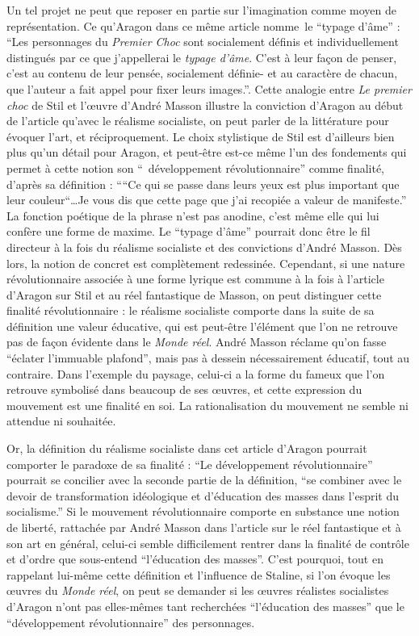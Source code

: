 	Un tel projet ne peut que reposer en partie sur l’imagination comme moyen de représentation. Ce qu’Aragon dans ce même article nomme le \enquote{typage d’âme} : \enquote{Les personnages du \emph{Premier Choc} sont socialement définis et individuellement distingués par ce que j’appellerai le \emph{typage d’âme}. C’est à leur façon de penser, c’est au contenu de leur pensée, socialement définie- et au caractère de chacun, que l’auteur a fait appel pour fixer leurs images.}. Cette analogie entre \emph{Le premier choc} de Stil et l’\oe{}uvre d’André Masson illustre la conviction d’Aragon au début de l’article qu’avec le réalisme socialiste, on peut parler de la littérature pour évoquer l’art, et réciproquement.  Le choix stylistique de Stil est d’ailleurs bien plus qu’un détail pour Aragon, et peut-être est-ce même l’un des fondements qui permet à cette notion son \enquote{ développement révolutionnaire} comme finalité, d’après sa définition : \enquote{“Ce qui se passe dans leurs yeux est plus important que leur couleur“…Je vous dis que cette page que j’ai recopiée a valeur de manifeste.} La fonction poétique de la phrase n’est pas anodine, c’est même elle qui lui confère une forme de maxime. Le \enquote{typage d’âme} pourrait donc être le fil directeur à la fois du réalisme socialiste et des convictions d’André Masson. Dès lors, la notion de concret est complètement redessinée. Cependant, si une nature révolutionnaire associée à une forme lyrique est commune à la fois à l’article d’Aragon sur Stil et au réel fantastique de Masson, on peut distinguer cette finalité révolutionnaire : le réalisme socialiste comporte dans la suite de sa définition une valeur éducative, qui est peut-être l’élément que l’on ne retrouve pas de façon évidente dans le \emph{Monde réel}. André Masson réclame qu'on fasse \enquote{éclater l’immuable plafond}, mais pas à dessein nécessairement éducatif, tout au contraire. Dans l’exemple du paysage, celui-ci a la forme du fameux que l’on retrouve symbolisé dans beaucoup de ses \oe{}uvres, et cette expression du mouvement est une finalité en soi. La rationalisation du mouvement ne semble ni attendue ni souhaitée. 

Or, la définition du réalisme socialiste dans cet article d’Aragon pourrait comporter le paradoxe de sa finalité : \enquote{Le développement révolutionnaire} pourrait se concilier avec la seconde partie de la définition, \enquote{se combiner avec le devoir de transformation idéologique et d’éducation des masses dans l’esprit du socialisme.} Si le mouvement révolutionnaire comporte en substance une notion de liberté, rattachée par André Masson dans l’article sur le réel fantastique et à son art en général, celui-ci semble difficilement rentrer dans la finalité de contrôle et d’ordre que sous-entend \enquote{l’éducation des masses}. C’est pourquoi, tout en rappelant lui-même cette définition et l’influence de Staline, si l’on évoque les \oe{}uvres du \emph{Monde réel}, on peut se demander si les \oe{}uvres réalistes socialistes d’Aragon n’ont pas elles-mêmes tant recherchées \enquote{l’éducation des masses} que le \enquote{développement révolutionnaire} des personnages. 


